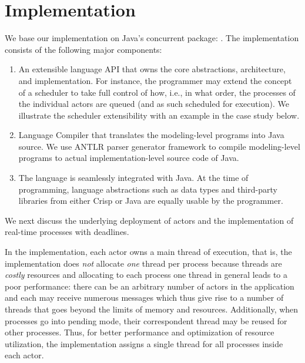 \section{Implementation} \label{sec:impl}
We base our implementation on Java's concurrent package: . 
The implementation consists of the following major components:
\begin{enumerate}
 \item An extensible language API that owns the core abstractions, architecture, and implementation. 
For instance, the programmer may extend the concept of a scheduler to take full control of how, i.e., in what order, the processes of the individual actors are queued
(and as such scheduled for execution).
We illustrate the scheduler extensibility with an example in the case study below.
 \item Language Compiler that translates the modeling-level programs into Java source.
 We use ANTLR \cite{antlr} parser generator framework to compile modeling-level programs to actual implementation-level source code of Java.
 \item The language is seamlessly integrated with Java.
 At the time of programming, language abstractions such as data types and third-party libraries from either Crisp or Java are equally usable by the programmer.
\end{enumerate}

We next discuss the underlying deployment of actors and the implementation
of real-time  processes with deadlines.

In the implementation, each actor owns a main thread of execution, that is,
the implementation does \emph{not} allocate \emph{one} thread per process because
threads are  \emph{costly} resources and
allocating to each process one thread in general leads to a poor performance:
there can be an arbitrary number of actors in the application and each may receive numerous messages which thus give rise to  a number of threads that  goes beyond the  limits of memory and resources.
Additionally, when processes go into pending mode, their correspondent thread may be reused for other processes.
Thus, for better performance and optimization of resource utilization, the implementation assigns a single thread for all processes inside each actor.


